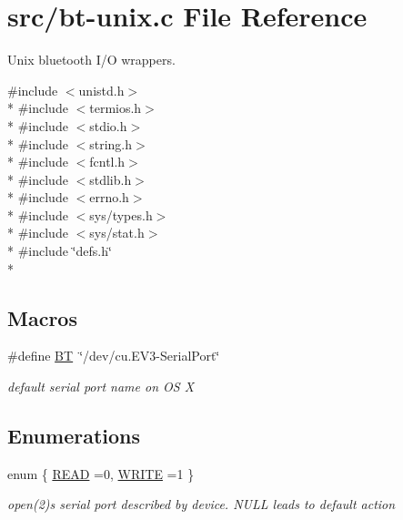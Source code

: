 \hypertarget{bt-unix_8c}{}\section{src/bt-\/unix.c File Reference}
\label{bt-unix_8c}


Unix bluetooth I/\+O wrappers.  


{\ttfamily \#include $<$unistd.\+h$>$}\\*
{\ttfamily \#include $<$termios.\+h$>$}\\*
{\ttfamily \#include $<$stdio.\+h$>$}\\*
{\ttfamily \#include $<$string.\+h$>$}\\*
{\ttfamily \#include $<$fcntl.\+h$>$}\\*
{\ttfamily \#include $<$stdlib.\+h$>$}\\*
{\ttfamily \#include $<$errno.\+h$>$}\\*
{\ttfamily \#include $<$sys/types.\+h$>$}\\*
{\ttfamily \#include $<$sys/stat.\+h$>$}\\*
{\ttfamily \#include \char`\"{}defs.\+h\char`\"{}}\\*
\subsection*{Macros}
\begin{DoxyCompactItemize}
\item 
\#define \hyperlink{bt-unix_8c_a9ed5212b4acf61bb0f7b9b9078ba67ae}{B\+T}~\char`\"{}/dev/cu.\+E\+V3-\/Serial\+Port\char`\"{}
\begin{DoxyCompactList}\small\item\em default serial port name on O\+S X \end{DoxyCompactList}\end{DoxyCompactItemize}
\subsection*{Enumerations}
\begin{DoxyCompactItemize}
\item 
enum \{ \hyperlink{bt-unix_8c_a06fc87d81c62e9abb8790b6e5713c55bacb9be765f361bb7efb9073730aac92c6}{R\+E\+A\+D} =0, 
\hyperlink{bt-unix_8c_a06fc87d81c62e9abb8790b6e5713c55ba61aa7ff70b76bff0fda378cf61d6afbc}{W\+R\+I\+T\+E} =1
 \}\begin{DoxyCompactList}\small\item\em open(2)s serial port described by device. {\ttfamily N\+U\+L\+L} leads to default action \end{DoxyCompactList}
\end{DoxyCompactItemize}
